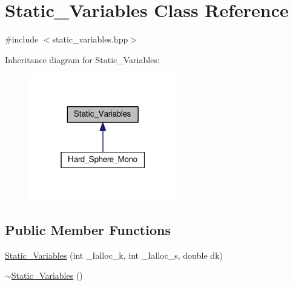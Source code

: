 \hypertarget{class_static___variables}{}\section{Static\+\_\+\+Variables Class Reference}
\label{class_static___variables}


{\ttfamily \#include $<$static\+\_\+variables.\+hpp$>$}



Inheritance diagram for Static\+\_\+\+Variables\+:\nopagebreak
\begin{figure}[H]
\begin{center}
\leavevmode
\includegraphics[width=183pt]{class_static___variables__inherit__graph}
\end{center}
\end{figure}
\subsection*{Public Member Functions}
\begin{DoxyCompactItemize}
\item 
\hyperlink{class_static___variables_a19f048f2f5344f8d83f06bb8ec123f65}{Static\+\_\+\+Variables} (int \+\_\+\+Ialloc\+\_\+k, int \+\_\+\+Ialloc\+\_\+s, double dk)
\item 
\hyperlink{class_static___variables_a0343b893aa23ccff9417184f6082ff43}{$\sim$\+Static\+\_\+\+Variables} ()
\end{DoxyCompactItemize}
